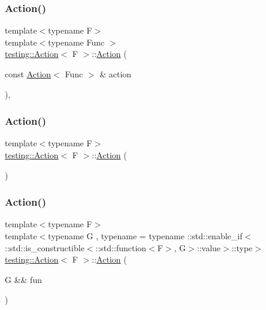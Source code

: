 \subsubsection{\texorpdfstring{Action()}{Action()}\hspace{0.1cm}{\footnotesize\ttfamily [4/12]}}
{\footnotesize\ttfamily template$<$typename F$>$ \\
template$<$typename Func $>$ \\
\mbox{\hyperlink{classtesting_1_1_action}{testing\+::\+Action}}$<$ F $>$\+::\mbox{\hyperlink{classtesting_1_1_action}{Action}} (\begin{DoxyParamCaption}\item[{const \mbox{\hyperlink{classtesting_1_1_action}{Action}}$<$ Func $>$ \&}]{action }\end{DoxyParamCaption})\hspace{0.3cm}{\ttfamily [inline]}, {\ttfamily [explicit]}}

\mbox{\label{classtesting_1_1_action_a967772922a39dd7098bee429d749f277}} 
\subsubsection{\texorpdfstring{Action()}{Action()}\hspace{0.1cm}{\footnotesize\ttfamily [5/12]}}
{\footnotesize\ttfamily template$<$typename F$>$ \\
\mbox{\hyperlink{classtesting_1_1_action}{testing\+::\+Action}}$<$ F $>$\+::\mbox{\hyperlink{classtesting_1_1_action}{Action}} (\begin{DoxyParamCaption}{ }\end{DoxyParamCaption})\hspace{0.3cm}{\ttfamily [inline]}}

\mbox{\label{classtesting_1_1_action_a2f5924eb6c0113be8f226aa3630b2cc2}} 
\subsubsection{\texorpdfstring{Action()}{Action()}\hspace{0.1cm}{\footnotesize\ttfamily [6/12]}}
{\footnotesize\ttfamily template$<$typename F$>$ \\
template$<$typename G , typename  = typename \+::std\+::enable\+\_\+if$<$                \+::std\+::is\+\_\+constructible$<$\+::std\+::function$<$\+F$>$, G$>$\+::value$>$\+::type$>$ \\
\mbox{\hyperlink{classtesting_1_1_action}{testing\+::\+Action}}$<$ F $>$\+::\mbox{\hyperlink{classtesting_1_1_action}{Action}} (\begin{DoxyParamCaption}\item[{G \&\&}]{fun }\end{DoxyParamCaption})\hspace{0.3cm}{\ttfamily [inline]}}

